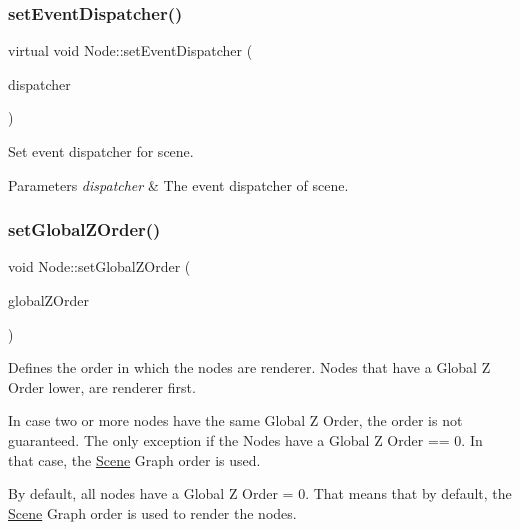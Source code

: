 \subsubsection{\texorpdfstring{set\+Event\+Dispatcher()}{setEventDispatcher()}\hspace{0.1cm}{\footnotesize\ttfamily [2/2]}}
{\footnotesize\ttfamily virtual void Node\+::set\+Event\+Dispatcher (\begin{DoxyParamCaption}\item[{\hyperlink{classEventDispatcher}{Event\+Dispatcher} $\ast$}]{dispatcher }\end{DoxyParamCaption})\hspace{0.3cm}{\ttfamily [virtual]}}

Set event dispatcher for scene.


\begin{DoxyParams}{Parameters}
{\em dispatcher} & The event dispatcher of scene. \\
\hline
\end{DoxyParams}
\mbox{\label{classNode_a32a5b9cb9a408d04008c4935a4776566}} 
\subsubsection{\texorpdfstring{set\+Global\+Z\+Order()}{setGlobalZOrder()}\hspace{0.1cm}{\footnotesize\ttfamily [1/2]}}
{\footnotesize\ttfamily void Node\+::set\+Global\+Z\+Order (\begin{DoxyParamCaption}\item[{float}]{global\+Z\+Order }\end{DoxyParamCaption})\hspace{0.3cm}{\ttfamily [virtual]}}

Defines the order in which the nodes are renderer. Nodes that have a Global Z Order lower, are renderer first.

In case two or more nodes have the same Global Z Order, the order is not guaranteed. The only exception if the Nodes have a Global Z Order == 0. In that case, the \hyperlink{classScene}{Scene} Graph order is used.

By default, all nodes have a Global Z Order = 0. That means that by default, the \hyperlink{classScene}{Scene} Graph order is used to render the nodes.

